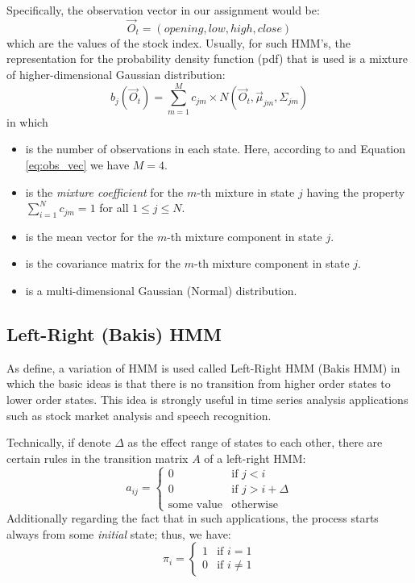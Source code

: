 \documentclass{acm_proc_article-sp}
\begin{document}
Specifically, the observation vector in our assignment would be:
\begin{equation} \label{eq:obs_vec}
\vec{O}_t = (opening, low, high, close)
\end{equation} 
which are the values of the stock index. Usually, for such HMM's, the representation for the probability density
function (pdf) that is used is a mixture of higher-dimensional Gaussian distribution:
\begin{equation} \label{eq:mmgd}
b_j(\vec{O}_t) = \sum_{m=1}^{M} c_{jm} \times N(\vec{O}_t, \vec{\mu}_{jm}, \Sigma_{jm})
\end{equation}
in which
\begin{itemize}
  \item {} is the number of observations in each state. Here, according to \cite{hassan:hmm_stock} and
  Equation \ref{eq:obs_vec} we have $M = 4$.
  \item {} is the \textit{mixture coefficient} for the $m$-th mixture in state $j$ having the property
  $\sum_{i = 1}^{N} c_{jm} = 1$ for all $1 \leq j \leq N$.
  \item {} is the mean vector for the $m$-th mixture component in state $j$.
  \item {} is the covariance matrix for the $m$-th mixture component in state $j$.
  \item {} is a multi-dimensional Gaussian (Normal) distribution.
\end{itemize} 

\subsection{Left-Right (Bakis) HMM}
As \cite{rabiner:hmm,gpds:hmm_tut} define, a variation of HMM is used called Left-Right HMM (Bakis HMM) in which the
basic ideas is that there is no transition from higher order states to lower order states. This idea is strongly
useful in time series analysis applications such as stock market analysis and speech recognition.

Technically, if denote $\Delta$ as the effect range of states to each other, there are certain rules in the transition
matrix $A$ of a left-right HMM:
\begin{equation}
a_{ij} =  
\begin{cases}
0 & \text{if } j < i \\
0 & \text{if } j > i + \Delta \\
\text{some value} & \text{otherwise}
\end{cases}
\end{equation}
Additionally regarding the fact that in such applications, the process starts always from some \textit{initial} state;
thus, we have:
\begin{equation}
\pi_i = 
\begin{cases}
1 & \text{if } i = 1 \\
0 & \text{if } i \neq 1 
\end{cases}
\end{equation}
\end{document}
